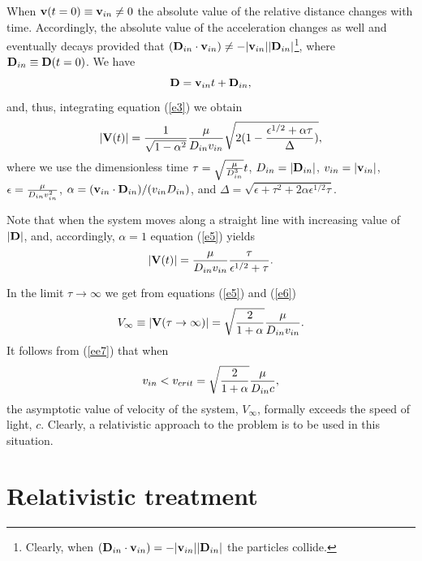 \documentclass[aip,nofootinbib]{revtex4}
\begin{document}
When ${\bf v}(t=0)\equiv {\bf v}_{in}\ne 0$ the absolute value of
the relative distance changes with time. Accordingly, the absolute
value of the acceleration changes as well and eventually decays
provided that $({\bf D}_{in} \cdot {\bf v}_{in}) \ne - |{\bf
v}_{in}||{\bf D}_{in}|$\footnote{Clearly, when $({\bf D}_{in}
\cdot {\bf v}_{in}) = - |{\bf v}_{in}||{\bf D}_{in}|$ the
particles collide.}, where ${\bf D}_{in}\equiv {\bf D}(t=0)$. We
have
\begin{equation} {\bf D}={\bf v}_{in}t + {\bf
D}_{in}, \label{e4}
\end{equation}
and, thus, integrating equation (\ref{e3}) we obtain
\begin{equation}
|{\bf V}(t)|={1\over \sqrt{1-\alpha^2}}{\mu \over D_{in} v_{in}}
\sqrt {2(1-{\epsilon^{1/2}+\alpha \tau\over \Delta})}, \label{e5}
\end{equation}
where we use the dimensionless time $\tau =\sqrt{{\mu \over
D_{in}^3}}t$, $D_{in}=|{\bf D}_{in}|$, $v_{in}=|{\bf v}_{in}|$,
$\epsilon ={\mu \over D_{in} v_{in}^2}$, $\alpha =({\bf
v}_{in}\cdot {\bf D}_{in})/(v_{in}D_{in})$, and $\Delta =\sqrt
{\epsilon +\tau^2+2\alpha \epsilon^{1/2}\tau}$.

Note that when the system moves along a straight line with
increasing value of $|{\bf D}|$, and, accordingly, $\alpha =1 $
equation (\ref{e5}) yields
\begin{equation}
|{\bf V}(t)|={\mu \over D_{in} v_{in}}{\tau \over
\epsilon^{1/2}+\tau}. \label{e6}
\end{equation}

In the limit $\tau \rightarrow \infty $ we get from equations
(\ref{e5}) and (\ref{e6})
\begin{equation}
V_{\infty}\equiv |{\bf V}(\tau \rightarrow \infty )|=\sqrt
{{2\over 1 +\alpha }}{\mu \over D_{in} v_{in}}. \label{ee7}
\end{equation}
It follows from (\ref{ee7}) that when
\begin{equation}
v_{in} < v_{crit}= \sqrt {{2\over 1 +\alpha }}{\mu \over D_{in} c}
\label{e7}, \label{e8}
\end{equation}
the asymptotic value of velocity of the system, $V_{\infty}$,
formally exceeds the speed of light, $c$. Clearly, a relativistic
approach to the problem is to be used in this situation.

\section{Relativistic treatment}
\end{document}
